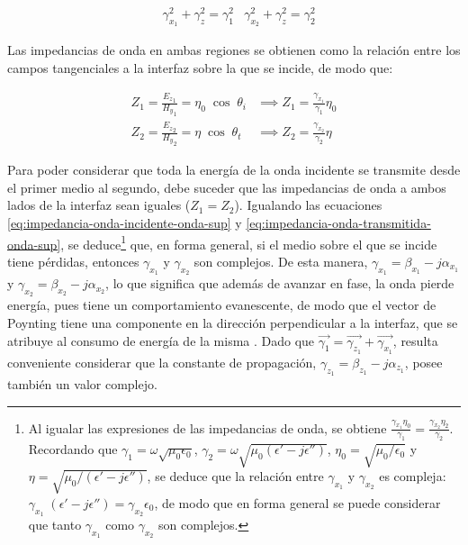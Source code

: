 \begin{align}
	\label{eq:condicion-componentes-normales-ondas-superficie}
	& \gamma_{x_1}^2 + \gamma_z^2 = \gamma_1^2 &\gamma_{x_2}^2 + \gamma_z^2 = \gamma_2^2
\end{align}

Las impedancias de onda en ambas regiones se obtienen como la relación entre los campos tangenciales a la interfaz sobre la que se incide, de modo que:

\begin{subequations}
\label{eq:impedancia-onda-superficie}
\begin{align}
	Z_1 = \frac{{E_z}_1}{{H_y}_1} = \eta_0 \; \cos\; \theta_i &\implies Z_1 = \frac{\gamma_{x_1}}{\gamma_1} \eta_0 \label{eq:impedancia-onda-incidente-onda-sup}\\
	Z_2 = \frac{{E_z}_2}{{H_y}_2} = \eta \; \cos \; \theta_t &\implies Z_2 = \frac{\gamma_{x_2}}{\gamma_2} \eta \label{eq:impedancia-onda-transmitida-onda-sup}
\end{align}
\end{subequations}

Para poder considerar que toda la energía de la onda incidente se transmite desde el primer medio al segundo, debe suceder que las impedancias de onda a ambos lados de la interfaz sean iguales ($Z_1 = Z_2$). Igualando las ecuaciones \ref{eq:impedancia-onda-incidente-onda-sup} y \ref{eq:impedancia-onda-transmitida-onda-sup}, se deduce\footnote{Al igualar las expresiones de las impedancias de onda, se obtiene $\frac{\gamma_{x_1} \eta_0}{\gamma_1} = \frac{\gamma_{x_2} \eta_2}{\gamma_2}$. Recordando que $\gamma_1=\omega \sqrt{\mu_0 \epsilon_0}$, $\gamma_2=\omega \sqrt{\mu_0 (\epsilon'-j\epsilon'')}$, $\eta_0 = \sqrt{\mu_0 / \epsilon_0}$ y $\eta = \sqrt{\mu_0 / (\epsilon'-j\epsilon'')}$, se deduce que la relación entre $\gamma_{x_1}$ y $\gamma_{x_2}$ es compleja: $\gamma_{x_1}\; (\epsilon' - j \epsilon'') = \gamma_{x_2} \epsilon_0$, de modo que en forma general se puede considerar que tanto $\gamma_{x_1}$ como $\gamma_{x_2}$ son complejos.} que, en forma general, si el medio sobre el que se incide tiene pérdidas, entonces $\gamma_{x_1}$ y $\gamma_{x_2}$ son complejos. De esta manera, $\gamma_{x_1} = \beta_{x_1} - j\alpha_{x_1}$ y $\gamma_{x_2} = \beta_{x_2} - j\alpha_{x_2}$, lo que significa que además de avanzar en fase, la onda pierde energía, pues tiene un comportamiento evanescente, de modo que el vector de Poynting tiene una componente en la dirección perpendicular a la interfaz, que se atribuye al consumo de energía de la misma \cite{Barlow:SurfaceWaves}. Dado que $\vec{\gamma_1} = \vec{\gamma_{z_1}} + \vec{\gamma_{x_1}}$, resulta conveniente considerar que la constante de propagación, $\gamma_{z_1} = \beta_{z_1} - j \alpha_{z_1}$, posee también un valor complejo.

